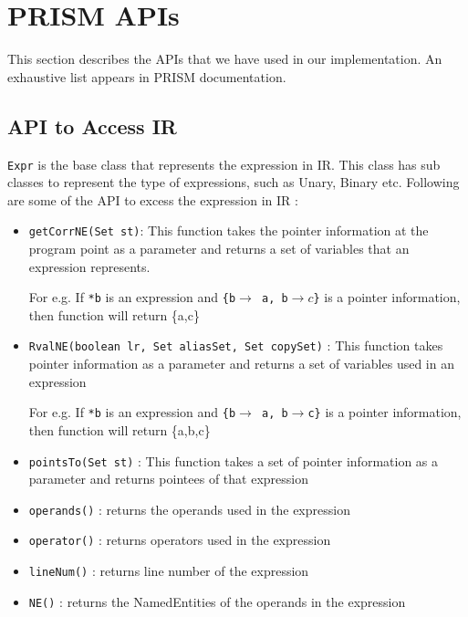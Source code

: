 \documentclass[11pt,a4paper,openright]{report}
\begin{document}
 
 
 
 
\chapter{PRISM APIs}\label{ap:B}

This section describes the APIs that we have used in our implementation. An exhaustive list appears in PRISM documentation.

\section{API to Access IR}
\texttt{Expr} is the base class that represents the expression in IR. This class has sub classes to represent the type of expressions, such as Unary, Binary etc.
Following are some of the API to excess the expression in IR :
\begin{itemize}
 \item \texttt{getCorrNE(Set st)}: This function takes the pointer information at the program point as a parameter and returns a set of variables that an expression represents.
 
 For e.g. If \texttt{*b} is an expression and \texttt{\{b$\rightarrow$ a, b$\rightarrow c$\}} is a pointer information, then function will return \{a,c\}
 
 \item \texttt{RvalNE(boolean lr, Set aliasSet, Set copySet)} : This function takes pointer information as a parameter and returns a set of variables used in an expression
 
 For e.g. If \texttt{*b} is an expression and \texttt{\{b$\rightarrow$ a, b$\rightarrow$c\}} is a pointer information, then function will return \{a,b,c\}
 
 \item \texttt{pointsTo(Set st)} : This function takes a set of pointer information as a parameter and returns pointees of that expression
 \item \texttt{operands()} : returns the operands used in the expression
 \item \texttt{operator()} : returns operators used in the expression
 \item \texttt{lineNum()} : returns line number of the expression
 \item \texttt{NE()} : returns the NamedEntities of the operands in the expression
\end{itemize}
\end{document}
